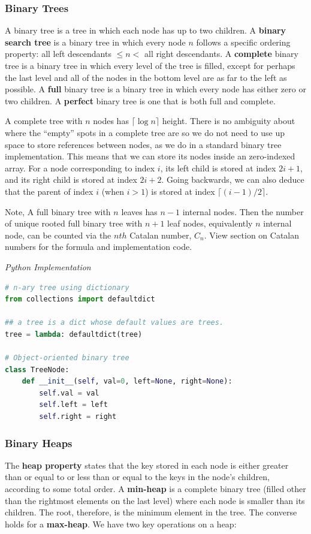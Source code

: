 \documentclass{article}
\begin{document}
    \subsubsection{Binary Trees}
    A binary tree is a tree in which each node has up to two children. A \textbf{binary search tree} is a binary tree in which every node $n$ follows a specific ordering property: all left descendants $\leq n <$ all right descendants. A \textbf{complete} binary tree is a binary tree in which every level of the tree is filled, except for perhaps the last level and all of the nodes in the bottom level are as far to the left as possible. A \textbf{full} binary tree is a binary tree in which every node has either zero or two children. A \textbf{perfect} binary tree is one that is both full and complete.
    
    A complete tree with $n$ nodes has $\lceil \log n \rceil$ height. There is no ambiguity about where the ``empty'' spots in a complete tree are so we do not need to use up space to store references between nodes, as we do in a standard binary tree implementation. This means that we can store its nodes inside an zero-indexed array. For a node corresponding to index $i$, its left child is stored at index $2i + 1$, and its right child is stored at index $2i + 2$. Going backwards, we can also deduce that the parent of index $i$ (when $i > 1$) is stored at index $\lceil (i-1)/2 \rceil$.

    Note, A full binary tree with $n$ leaves has $n - 1$ internal nodes. Then the number of unique rooted full binary tree with $n + 1$ leaf nodes, equivalently $n$ internal node, can be counted via the $nth$ Catalan number, $C_n$. View section on Catalan numbers for the formula and implementation code.

\vspace{8pt} \emph{Python Implementation}
\begin{lstlisting}[language=Python]
# n-ary tree using dictionary
from collections import defaultdict

## a tree is a dict whose default values are trees. 
tree = lambda: defaultdict(tree)

# Object-oriented binary tree
class TreeNode:
    def __init__(self, val=0, left=None, right=None):
        self.val = val
        self.left = left
        self.right = right
\end{lstlisting}
    
    \subsubsection{Binary Heaps}
    The \textbf{heap property} states that the key stored in each node is either greater than or equal to or less than or equal to the keys in the node's children, according to some total order. A \textbf{min-heap} is a complete binary tree (filled other than the rightmost elements on the last level) where each node is smaller than its children. The root, therefore, is the minimum element in the tree. The converse holds for a \textbf{max-heap}. We have two key operations on a heap: 
    
\end{document}
